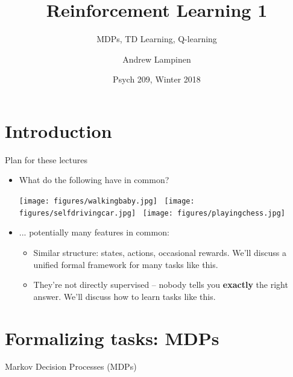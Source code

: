 \documentclass{beamer}
\begin{document}
\title{Reinforcement Learning 1}
\subtitle{MDPs, TD Learning, Q-learning}
\author{Andrew Lampinen}
\date{Psych 209, Winter 2018}
\frame{\titlepage}


\section{Introduction}
\begin{frame}{Plan for these lectures}
\begin{itemize}
    \item What do the following have in common?
    \begin{center}
        \texttt{[image: figures/walkingbaby.jpg]}~
        \texttt{[image: figures/selfdrivingcar.jpg]}~
        \texttt{[image: figures/playingchess.jpg]}
    \end{center}
    \item<2-> ... potentially many features in common:
    \begin{itemize} 
        \item<3-> Similar structure: states, actions, occasional rewards. We'll discuss a unified formal framework for many tasks like this. 
        \item<4-> They're not directly supervised -- nobody tells you \textbf{exactly} the right answer. We'll discuss how to learn tasks like this. 
    \end{itemize}
    
\end{itemize}
\end{frame}

\section{Formalizing tasks: MDPs}
\begin{frame}{Markov Decision Processes (MDPs)}
\begin{figure}
\centering
{}
\end{figure}
\end{frame}
\end{document}
